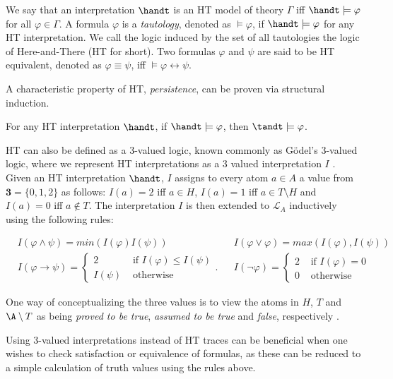 We say that an interpretation $\handt$ is an HT model of theory
$\Gamma$ iff $\handt \models \varphi$ for all $\varphi \in \Gamma$. A
formula $\varphi$ is a \textit{tautology}, denoted as
$\models \varphi$, if $\handt \models \varphi$ for any HT
interpretation. We call the logic induced by the set of all
tautologies the logic of Here-and-There (HT for short). Two formulas
$\varphi$ and $\psi$ are said to be HT equivalent, denoted as
$\varphi \equiv \psi$, iff $\models \varphi \leftrightarrow \psi$.

A characteristic property of HT, \textit{persistence}, can be proven
via structural induction.

\begin{proposition}[Persistence]
  For any HT interpretation $\handt$, if $\handt \models \varphi$,
  then $\tandt \models \varphi$.
\end{proposition}

HT can also be defined as a 3-valued logic, known commonly as
Gödel's 3-valued logic, where we represent HT interpretations as a 3
valued interpretation $I$ \cite{capeva05a}. Given an HT interpretation
$\handt$, $I$ assigns to every atom $a\in A$ a value from
$\textbf{3}=\{ 0, 1, 2 \}$ as follows: $I(a)=2$ iff $a \in H$,
$I(a)=1$ iff $a \in T \setminus H$ and $I(a)=0$ iff $a \not\in T$. The
interpretation $I$ is then extended to $\mathcal{L}_A$ inductively using the
following rules:

\begin{align*}
&I(\varphi \wedge \psi) = min(I(\varphi) I(\psi)) 
&&I(\varphi \vee \varphi) = max(I(\varphi),I(\psi)) \\
&I(\varphi \rightarrow \psi) = 
\begin{cases}
  2 & \text { if } I(\varphi) \leq I(\psi) \\
  I(\psi) & \text { otherwise }
\end{cases}.
&&I(\neg \varphi) = \begin{cases}2 
  & \text { if } I(\varphi)=0 \\ 
  0 & \text { otherwise }\end{cases} 
\end{align*}

One way of conceptualizing the three values is to view the atoms in $H$,
$T$ and $\A \setminus T$ as being \textit{proved to be true},
\textit{assumed to be true} and \textit{false}, respectively
\cite{agcadipescscvi20a}.

Using 3-valued interpretations instead of HT traces can be beneficial
when one wishes to check satisfaction or equivalence of formulas, as
these can be reduced to a simple calculation of truth values using the
rules above.

